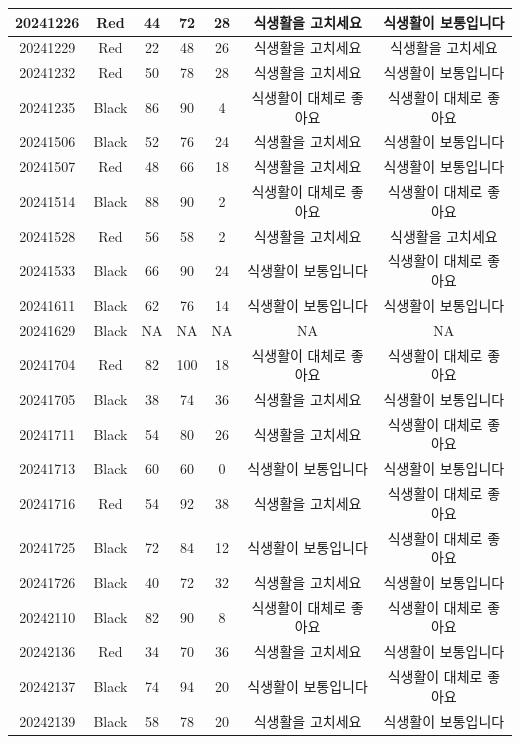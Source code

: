 \documentclass[
]{book}
\begin{document}
\begin{tabular}{c|c|c|c|c|c|c}
\hline
20241226 & Red & 44 & 72 & 28 & 식생활을 고치세요 & 식생활이 보통입니다\\
\hline
20241229 & Red & 22 & 48 & 26 & 식생활을 고치세요 & 식생활을 고치세요\\
\hline
20241232 & Red & 50 & 78 & 28 & 식생활을 고치세요 & 식생활이 보통입니다\\
\hline
20241235 & Black & 86 & 90 & 4 & 식생활이 대체로 좋아요 & 식생활이 대체로 좋아요\\
\hline
20241506 & Black & 52 & 76 & 24 & 식생활을 고치세요 & 식생활이 보통입니다\\
\hline
20241507 & Red & 48 & 66 & 18 & 식생활을 고치세요 & 식생활이 보통입니다\\
\hline
20241514 & Black & 88 & 90 & 2 & 식생활이 대체로 좋아요 & 식생활이 대체로 좋아요\\
\hline
20241528 & Red & 56 & 58 & 2 & 식생활을 고치세요 & 식생활을 고치세요\\
\hline
20241533 & Black & 66 & 90 & 24 & 식생활이 보통입니다 & 식생활이 대체로 좋아요\\
\hline
20241611 & Black & 62 & 76 & 14 & 식생활이 보통입니다 & 식생활이 보통입니다\\
\hline
20241629 & Black & NA & NA & NA & NA & NA\\
\hline
20241704 & Red & 82 & 100 & 18 & 식생활이 대체로 좋아요 & 식생활이 대체로 좋아요\\
\hline
20241705 & Black & 38 & 74 & 36 & 식생활을 고치세요 & 식생활이 보통입니다\\
\hline
20241711 & Black & 54 & 80 & 26 & 식생활을 고치세요 & 식생활이 대체로 좋아요\\
\hline
20241713 & Black & 60 & 60 & 0 & 식생활이 보통입니다 & 식생활이 보통입니다\\
\hline
20241716 & Red & 54 & 92 & 38 & 식생활을 고치세요 & 식생활이 대체로 좋아요\\
\hline
20241725 & Black & 72 & 84 & 12 & 식생활이 보통입니다 & 식생활이 대체로 좋아요\\
\hline
20241726 & Black & 40 & 72 & 32 & 식생활을 고치세요 & 식생활이 보통입니다\\
\hline
20242110 & Black & 82 & 90 & 8 & 식생활이 대체로 좋아요 & 식생활이 대체로 좋아요\\
\hline
20242136 & Red & 34 & 70 & 36 & 식생활을 고치세요 & 식생활이 보통입니다\\
\hline
20242137 & Black & 74 & 94 & 20 & 식생활이 보통입니다 & 식생활이 대체로 좋아요\\
\hline
20242139 & Black & 58 & 78 & 20 & 식생활을 고치세요 & 식생활이 보통입니다\\

\end{tabular}
\end{document}
